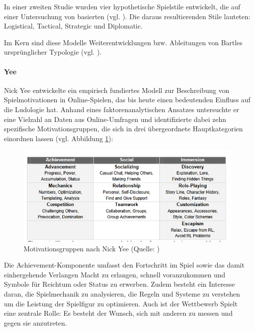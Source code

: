 In einer zweiten Studie wurden vier hypothetische Spielstile entwickelt, die auf einer Untersuchung von \cite{berens_understanding_2000} basierten (vgl. \cite{bateman_player_2012}). Die daraus resultierenden Stile lauteten: Logistical, Tactical, Strategic und Diplomatic.

Im Kern sind diese Modelle Weiterentwicklungen bzw. Ableitungen von Bartles ursprünglicher Typologie (vgl. \cite{ludologie_spielertypen_nodate}).

\paragraph{Yee}
Nick Yee entwickelte ein empirisch fundiertes Modell zur Beschreibung von Spielmotivationen in Online-Spielen, das bis heute einen bedeutenden Einfluss auf die Ludologie hat. Anhand eines faktorenanalytischen Ansatzes untersuchte er eine Vielzahl an Daten aus Online-Umfragen und identifizierte dabei zehn spezifische Motivationsgruppen, die sich in drei übergeordnete Hauptkategorien einordnen lassen (vgl. Abbildung \ref{fig:nick_yee_motivations}):

\begin{figure}[ht]
\centering
\includegraphics[width=1\linewidth]{content/pictures/nick_yee_categorizations.PNG}
\caption{Motivationsgruppen nach Nick Yee (Quelle: \cite{yee_motivations_nodate})}
\label{fig:nick_yee_motivations}
\end{figure}

Die Achievement-Komponente umfasst den Fortschritt im Spiel sowie das damit einhergehende Verlangen Macht zu erlangen, schnell voranzukommen und Symbole für Reichtum oder Status zu erwerben. Zudem besteht ein Interesse daran, die Spielmechanik zu analysieren, die Regeln und Systeme zu verstehen um die Leistung der Spielfigur zu optimieren. Auch ist der Wettbewerb Spielt eine zentrale Rolle: Es besteht der Wunsch, sich mit anderen zu messen und gegen sie anzutreten.

